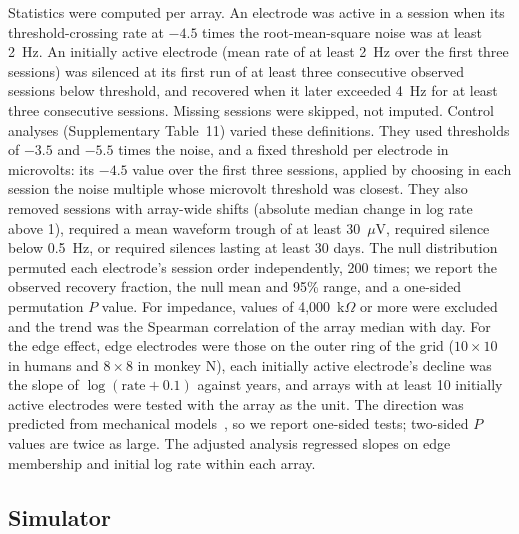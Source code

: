 \documentclass{iopjournal}
\begin{document}
Statistics were computed per array. An electrode was active in a session when its threshold-crossing rate at $-4.5$ times
the root-mean-square noise was at least 2~Hz. An initially active electrode (mean rate of at least 2~Hz over the first
three sessions) was silenced at its first run of at least three consecutive observed sessions below threshold, and
recovered when it later exceeded 4~Hz for at least three consecutive sessions. Missing sessions were skipped, not
imputed. Control analyses (Supplementary Table~11) varied these definitions. They used thresholds of $-3.5$ and $-5.5$ times
the noise, and a fixed threshold per electrode in microvolts: its $-4.5$ value over the first three sessions, applied by
choosing in each session the noise multiple whose microvolt threshold was closest. They also removed sessions with
array-wide shifts (absolute median change in log rate above 1), required a mean waveform trough of at least 30~$\mu$V,
required silence below 0.5~Hz, or required silences lasting at least 30 days. The null distribution permuted each electrode's session order
independently, 200 times; we report the observed recovery fraction, the null mean and 95\% range, and a one-sided
permutation $P$ value. For impedance, values of 4,000~k$\Omega$ or more were excluded and the trend was the Spearman
correlation of the array median with day. For the edge effect, edge electrodes were those on the outer ring of the grid
($10\times10$ in humans and $8\times8$ in monkey N), each initially active electrode's decline was the slope of
$\log(\text{rate} + 0.1)$ against years, and arrays with at least 10 initially active electrodes were tested with the
array as the unit. The direction was predicted from mechanical models~\cite{forrest2025}, so we report one-sided tests;
two-sided $P$ values are twice as large. The adjusted analysis regressed slopes on edge membership and initial log rate
within each array.

\subsection{Simulator}
\end{document}
